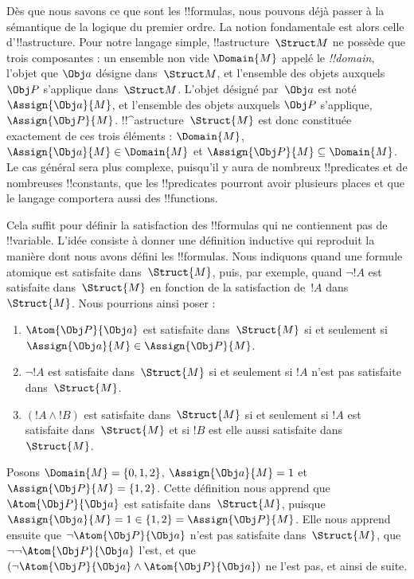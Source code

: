 \documentclass[11pt,a4paper,openany]{memoir}
\begin{document}


Dès que nous savons ce que sont les !!{formula}s, nous pouvons déjà
passer à la sémantique de la logique du premier ordre. La notion
fondamentale est alors celle d'!!a{structure}. Pour notre langage
simple, !!a{structure}~$\Struct M$ ne possède que trois composantes :
un ensemble non vide $\Domain{M}$ appelé le \emph{!!{domain}}, l'objet
que $\Obj a$ désigne dans~$\Struct M$, et l'ensemble des objets auxquels
$\Obj P$ s'applique dans~$\Struct M$. L'objet désigné par~$\Obj a$ est
noté~$\Assign{\Obj a}{M}$, et l'ensemble des objets auxquels $\Obj P$
s'applique,~$\Assign{\Obj P}{M}$. !!^a{structure}~$\Struct{M}$ est donc
constituée exactement de ces trois éléments :
$\Domain{M}$, $\Assign{\Obj a}{M} \in \Domain{M}$ et
$\Assign{\Obj P}{M} \subseteq \Domain{M}$. Le cas général sera plus
complexe, puisqu'il y aura de nombreux !!{predicate}s et de nombreuses
!!{constant}s, que les !!{predicate}s pourront avoir plusieurs places
et que le langage comportera aussi des !!{function}s.

Cela suffit pour définir la satisfaction des !!{formula}s qui ne
contiennent pas de !!{variable}. L'idée consiste à donner une définition
inductive qui reproduit la manière dont nous avons défini les
!!{formula}s. Nous indiquons quand une formule atomique est satisfaite
dans~$\Struct{M}$, puis, par exemple, quand $\lnot !A$ est satisfaite
dans~$\Struct{M}$ en fonction de la satisfaction de~$!A$
dans~$\Struct{M}$. Nous
pourrions ainsi poser :
\begin{enumerate}
  \item $\Atom{\Obj P}{\Obj a}$ est satisfaite dans~$\Struct{M}$ si et
  seulement si $\Assign{\Obj a}{M} \in \Assign{\Obj P}{M}$.
  \item $\lnot !A$ est satisfaite dans~$\Struct{M}$ si et seulement si
  $!A$ n'est pas satisfaite dans~$\Struct{M}$.
  \item $(!A \land !B)$ est satisfaite dans~$\Struct{M}$ si et
  seulement si $!A$ est satisfaite dans~$\Struct{M}$ et si $!B$ est
  elle aussi satisfaite dans~$\Struct{M}$.
\end{enumerate}
Posons $\Domain{M} = \{0, 1, 2\}$,
$\Assign{\Obj a}{M} = 1$ et
$\Assign{\Obj P}{M} = \{1, 2\}$. Cette définition nous apprend que
$\Atom{\Obj P}{\Obj a}$ est satisfaite dans~$\Struct{M}$, puisque
$\Assign{\Obj a}{M} = 1 \in \{1,2\} = \Assign{\Obj P}{M}$. Elle nous
apprend ensuite que $\lnot \Atom{\Obj P}{\Obj a}$ n'est pas satisfaite
dans~$\Struct{M}$, que
$\lnot\lnot \Atom{\Obj P}{\Obj a}$ l'est, et que
$(\lnot \Atom{\Obj P}{\Obj a} \land \Atom{\Obj P}{\Obj a})$ ne l'est
pas, et ainsi de suite.
\end{document}
